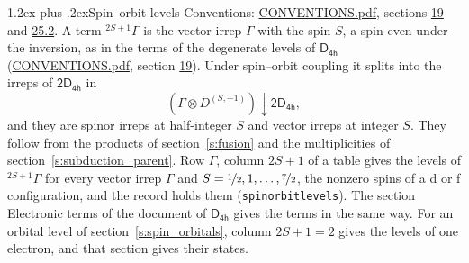 \documentclass[10pt,a4paper]{article}
\makeatletter
\renewcommand\section{\@startsection{section}{1}{\z@}{-3ex plus -1ex minus -.2ex}%
  {1.2ex plus .2ex}{\normalfont\large\sffamily\bfseries\color{parttitle}}}
\numberwithin{equation}{section}
\newcommand{\grp}[1]{\mathsf{#1}}
\newcommand{\restr}[2]{#1\!\downarrow#2}
\newcommand{\irrJp}[2]{D^{(#1,#2)}}
\newcommand{\irrprod}{\otimes}
\newcommand{\term}[2]{{}^{#1}#2}
\makeatother
\begin{document}
\section{Spin--orbit levels}\label{s:spin_orbit}
Conventions: \href{../../CONVENTIONS.pdf}{CONVENTIONS.pdf}, sections \href{../../../rotation/CONVENTIONS.pdf\#conv.19}{19} and \href{../../CONVENTIONS.pdf\#conv.25.2}{25.2}.
\leavevmode\label{n:local.spin}\label{n:symbol.term}A term $\term{2S+1}{\Gamma}$ is the vector irrep $\Gamma$ with the spin $S$, a spin even under the inversion, as in the terms of the degenerate levels of \href{../../../rotation/data/pdf/D4h.pdf}{$\grp{D_{4h}}$} (\href{../../CONVENTIONS.pdf}{CONVENTIONS.pdf}, section \href{../../../rotation/CONVENTIONS.pdf\#conv.19}{19}). Under spin--orbit coupling it splits into the irreps of $\grp{2D_{4h}}$ in
\begin{equation}\label{e:spinorbit}\restr{(\Gamma \irrprod \irrJp{S}{+1})}{\grp{2D_{4h}}},\end{equation}
and they are spinor irreps at half-integer $S$ and vector irreps at integer $S$. They follow from the products of section~\ref{s:fusion} and the multiplicities of section~\ref{s:subduction_parent}. Row $\Gamma$, column $2S + 1$ of a table gives the levels of $\term{2S+1}{\Gamma}$ for every vector irrep $\Gamma$ and $S = \nicefrac{1}{2}, 1, \dots, \nicefrac{7}{2}$, the nonzero spins of a d or f configuration, and the record holds them (\texttt{spinorbitlevels}). The section Electronic terms of the document of \href{../../../rotation/data/pdf/D4h.pdf}{$\grp{D_{4h}}$} gives the terms in the same way. For an orbital level of section~\ref{s:spin_orbitals}, column $2S + 1 = 2$ gives the levels of one electron, and that section gives their states.
\end{document}
